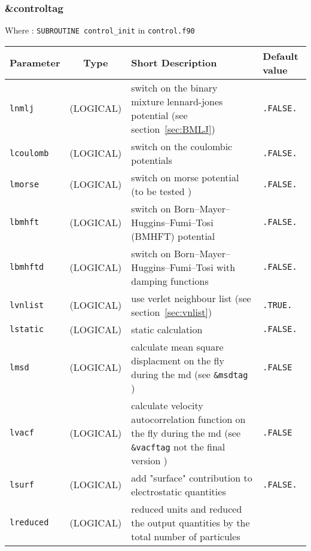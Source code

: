 \documentclass[a4paper]{article}
\begin{document}
\subsubsection{\&controltag }

Where : \verb?SUBROUTINE control_init? in \verb?control.f90?
\newline

\begin{longtable}{l|c|m{8cm}|m{2cm}}
\hline
\hline
Parameter        &  Type              &          Short Description                                                          & Default value \\
\hline
\hline
\rule[-0.75cm]{0cm}{1.5cm}
\verb?lnmlj?     & (LOGICAL)          &  switch on the binary mixture lennard-jones potential (see section~\ref{sec:BMLJ})  & \verb?.FALSE.?  \\
\hline
\rule[-0.75cm]{0cm}{1.5cm}
\verb?lcoulomb?  & (LOGICAL)          &  switch on the coulombic potentials                                                 & \verb?.FALSE.? \\
\hline
\rule[-0.75cm]{0cm}{1.5cm}
\verb?lmorse?    & (LOGICAL)          &  switch on morse potential (to be tested )                                          & \verb?.FALSE.? \\
\hline
\rule[-0.75cm]{0cm}{1.5cm}
\verb?lbmhft?    & (LOGICAL)          &  switch on Born–Mayer–Huggins–Fumi–Tosi (BMHFT) potential                           & \verb?.FALSE.? \\
\hline
\rule[-0.75cm]{0cm}{1.5cm}
\verb?lbmhftd?   & (LOGICAL)          &  switch on Born–Mayer–Huggins–Fumi–Tosi  with damping functions                     & \verb?.FALSE.? \\
\hline
\rule[-0.75cm]{0cm}{1.5cm}
\verb?lvnlist?   & (LOGICAL)          &  use verlet neighbour list (see section~\ref{sec:vnlist})                           & \verb?.TRUE.?  \\
\hline
\rule[-0.75cm]{0cm}{1.5cm}
\verb?lstatic?   & (LOGICAL)          &  static calculation                                                                 & \verb?.FALSE.? \\
\hline
\rule[-0.75cm]{0cm}{1.5cm}
\verb?lmsd?      & (LOGICAL)          & calculate mean square displacment on the fly during the md (see \verb?&msdtag? )    & \verb?.FALSE? \\
\hline
\rule[-0.75cm]{0cm}{1.5cm}
\verb?lvacf?     & (LOGICAL)          & calculate velocity autocorrelation function on the fly during the md 
                                        (see \verb?&vacftag? not the final version )                                        & \verb?.FALSE? \\
\hline
\rule[-0.75cm]{0cm}{1.5cm}
\verb?lsurf?     & (LOGICAL)          &  add "surface" contribution to electrostatic quantities                             & \verb?.FALSE.?  \\
\hline
\rule[-0.75cm]{0cm}{1.5cm}
\verb?lreduced?  & (LOGICAL)          &  \newline reduced units and reduced the output quantities by the 
                                         total number of particules \newline


\end{longtable}
\end{document}
